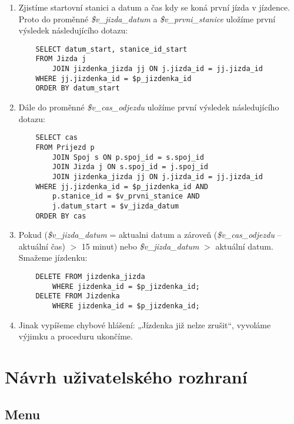 \documentclass[11pt]{article}
\begin{document}
\begin{enumerate}
    \item Zjistíme startovní stanici a datum a čas kdy se koná první jízda v jízdence. Proto do proměnné \textit{\$v\_jizda\_datum} a \textit{\$v\_prvni\_stanice} uložíme první výsledek následujícího dotazu:
    \begin{lstlisting}
    SELECT datum_start, stanice_id_start
    FROM Jizda j
        JOIN jizdenka_jizda jj ON j.jizda_id = jj.jizda_id
    WHERE jj.jizdenka_id = $p_jizdenka_id
    ORDER BY datum_start
    \end{lstlisting}
    
    \item Dále do proměnné \textit{\$v\_cas\_odjezdu} uložíme první výsledek následujícího dotazu:
    \begin{lstlisting}
    SELECT cas
    FROM Prijezd p
        JOIN Spoj s ON p.spoj_id = s.spoj_id
        JOIN Jizda j ON s.spoj_id = j.spoj_id
        JOIN jizdenka_jizda jj ON j.jizda_id = jj.jizda_id
    WHERE jj.jizdenka_id = $p_jizdenka_id AND
        p.stanice_id = $v_prvni_stanice AND
        j.datum_start = $v_jizda_datum
    ORDER BY cas
    \end{lstlisting}

    \item Pokud (\textit{\$v\_jizda\_datum} = aktualni datum a zároveň (\textit{\$v\_cas\_odjezdu} – aktuální čas) $>$ 15 minut) nebo \textit{\$v\_jizda\_datum} $>$ aktuální datum. Smažeme jízdenku:
    \begin{lstlisting}
    DELETE FROM jizdenka_jizda
        WHERE jizdenka_id = $p_jizdenka_id;
    DELETE FROM Jizdenka
        WHERE jizdenka_id = $p_jizdenka_id;
    \end{lstlisting}

    \item Jinak vypíšeme chybové hlášení: „Jízdenka již nelze zrušit“, vyvoláme výjimku a proceduru ukončíme.
\end{enumerate}


\newpage

\section{Návrh uživatelského rozhraní}

\subsection{Menu}
\end{document}
